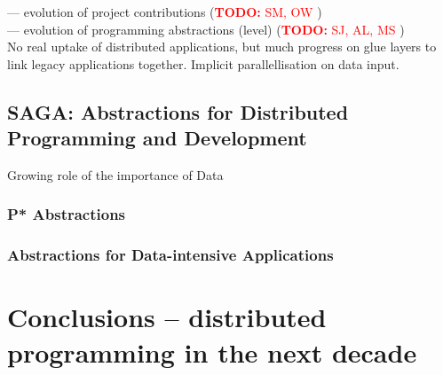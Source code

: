 \documentclass{article}
\newcommand{\B}[1]{\textbf{#1}}
\newcommand{\todo}[1]{{\textcolor{red}{\B{TODO:} #1 }}}
\begin{document}
 --- evolution of project contributions (\todo{SM, OW})\\
 
 --- evolution of programming abstractions (level) (\todo{SJ, AL, MS})\\
 
No real uptake of distributed applications, but much progress on glue layers to link legacy applications together.
Implicit parallellisation on data input.


\subsection{SAGA: Abstractions for Distributed Programming and
  Development}

Growing role of the importance of Data


\subsubsection{P* Abstractions}

\subsubsection{Abstractions for Data-intensive Applications}


\section{Conclusions -- distributed programming in the next decade}







\footnotesize


\end{document}

